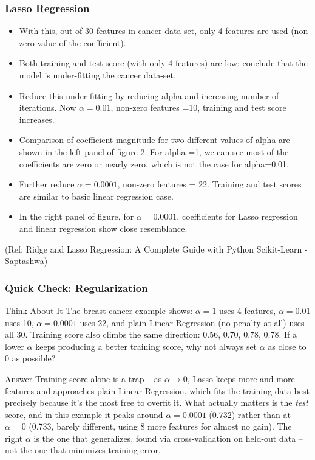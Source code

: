 \begin{frame}[fragile]\frametitle{Lasso Regression}
\begin{itemize}
\item With this, out of 30 features in cancer data-set, only 4 features are used (non zero value of the coefficient).
\item Both training and test score (with only 4 features) are low; conclude that the model is under-fitting the cancer data-set.
\item Reduce this under-fitting by reducing alpha and increasing number of iterations. Now $\alpha = 0.01$, non-zero features =10, training and test score increases.
\item Comparison of coefficient magnitude for two different values of alpha are shown in the left panel of figure 2. For alpha =1, we can see most of the coefficients are zero or nearly zero, which is not the case for alpha=0.01.
\item Further reduce $\alpha =0.0001$, non-zero features = 22. Training and test scores are similar to basic linear regression case.
\item In the right panel of figure, for $\alpha = 0.0001$, coefficients for Lasso regression and linear regression show close resemblance.
\end{itemize}


{\tiny (Ref: Ridge and Lasso Regression: A Complete Guide with Python Scikit-Learn - Saptashwa)}
\end{frame}

\begin{frame}[fragile]\frametitle{Quick Check: Regularization}
\begin{block}{Think About It}
The breast cancer example shows: $\alpha=1$ uses 4 features, $\alpha=0.01$ uses 10, $\alpha=0.0001$ uses 22, and plain Linear Regression (no penalty at all) uses all 30. Training score also climbs the same direction: 0.56, 0.70, 0.78, 0.78. If a lower $\alpha$ keeps producing a better training score, why not always set $\alpha$ as close to 0 as possible?
\end{block}
\pause
\begin{block}{Answer}
Training score alone is a trap -- as $\alpha \to 0$, Lasso keeps more and more features and approaches plain Linear Regression, which fits the training data best precisely because it's the most free to overfit it. What actually matters is the \emph{test} score, and in this example it peaks around $\alpha=0.0001$ (0.732) rather than at $\alpha=0$ (0.733, barely different, using 8 more features for almost no gain). The right $\alpha$ is the one that generalizes, found via cross-validation on held-out data -- not the one that minimizes training error.
\end{block}
\end{frame}





